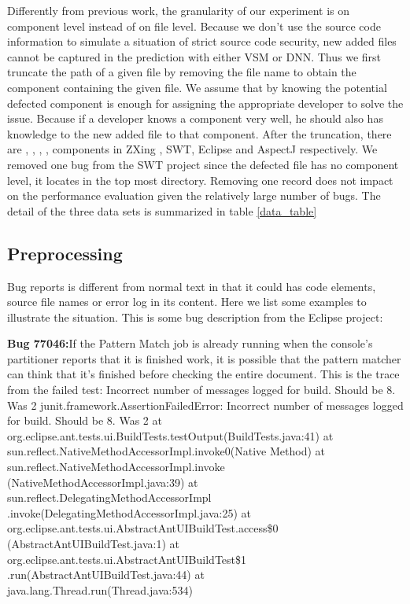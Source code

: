 Differently from previous work, the granularity of our experiment is on component level instead of on file level. 
Because we don't use the source code information to simulate a situation of strict source code security, new added files cannot be captured in the prediction with either VSM or DNN.
Thus we first truncate the path of a given file by removing the file name to obtain the component containing the given file. 
We assume that by knowing the potential defected component is enough for assigning the appropriate developer to solve the issue.
Because if a developer knows a component very well, he should also has knowledge to the new added file to that component.
After the truncation, there are , , , , components in ZXing , SWT, Eclipse and AspectJ respectively. 
We removed one bug from the SWT project since the defected file has no component level, it locates in the top most directory. 
Removing one record does not impact on the performance evaluation given the relatively large number of bugs. 
The detail of the three data sets is summarized in table \ref{data_table}

\subsection{Preprocessing}
Bug reports is different from normal text in that it could has code elements, source file names or error log in its content. 
Here we list some examples to illustrate the situation. 
This is some bug description from the Eclipse project:

\textbf{Bug 77046:}If the Pattern Match job is already running when the console's partitioner reports that it is finished work, it is possible that the pattern matcher can think that it's finished before checking the entire document. This is the trace from the failed test: Incorrect number of messages logged for build. Should be 8. Was 2 junit.framework.AssertionFailedError: Incorrect number of messages logged for build. Should be 8. Was 2 at\\ org.eclipse.ant.tests.ui.BuildTests.testOutput(BuildTests.java:41) at\\ sun.reflect.NativeMethodAccessorImpl.invoke0(Native Method) at\\ sun.reflect.NativeMethodAccessorImpl.invoke\\(NativeMethodAccessorImpl.java:39) at\\ sun.reflect.DelegatingMethodAccessorImpl\\.invoke(DelegatingMethodAccessorImpl.java:25) at\\ org.eclipse.ant.tests.ui.AbstractAntUIBuildTest.access\$0\\(AbstractAntUIBuildTest.java:1) at\\ org.eclipse.ant.tests.ui.AbstractAntUIBuildTest\$1\\.run(AbstractAntUIBuildTest.java:44) at\\ java.lang.Thread.run(Thread.java:534)



